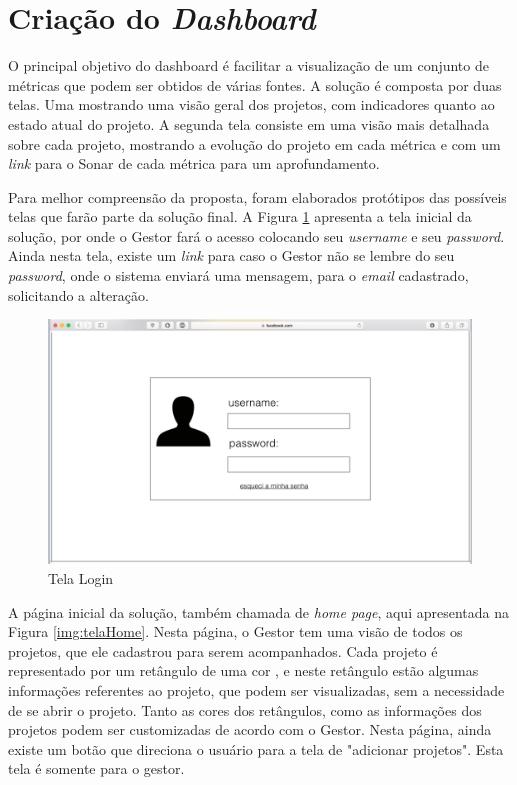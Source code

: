 \section{Criação do \textit{Dashboard}}

O principal objetivo do dashboard é facilitar a visualização de um conjunto de métricas que podem ser obtidos de várias fontes. A solução é composta por duas telas. Uma mostrando uma visão geral dos projetos, com indicadores quanto ao estado atual do projeto. A segunda tela consiste em uma visão mais detalhada sobre cada projeto, mostrando a evolução do projeto em cada métrica e com um \textit{link} para o Sonar de cada métrica para um aprofundamento.

Para melhor compreensão da proposta, foram elaborados protótipos das possíveis telas que farão parte da solução final. A Figura \ref{img:telaLogin} apresenta a tela inicial da solução, por onde o Gestor fará o acesso colocando seu \textit{username} e seu \textit{password}. Ainda nesta tela, existe um \textit{link} para caso o Gestor não se lembre do seu \textit{password}, onde o sistema enviará uma mensagem, para o \textit{email} cadastrado, solicitando a alteração.

\graphicspath{{figuras/}}
\begin{figure}
\centering
\includegraphics[scale=0.60]{telaLogin.png}
\caption{Tela Login}
\label{img:telaLogin}
\end{figure}

A página inicial da solução, também chamada de \textit{home page}, aqui apresentada na Figura \ref{img:telaHome}. Nesta página, o Gestor tem uma visão de todos os projetos, que ele cadastrou para serem acompanhados. Cada projeto é representado por um retângulo de uma cor , e neste retângulo estão algumas informações referentes ao projeto, que podem ser visualizadas, sem a necessidade de se abrir o projeto. Tanto as cores dos retângulos, como as informações dos projetos podem ser customizadas de acordo com o Gestor. Nesta página, ainda existe um botão que direciona o usuário para a tela de "adicionar projetos". Esta tela é somente para o gestor.
 
